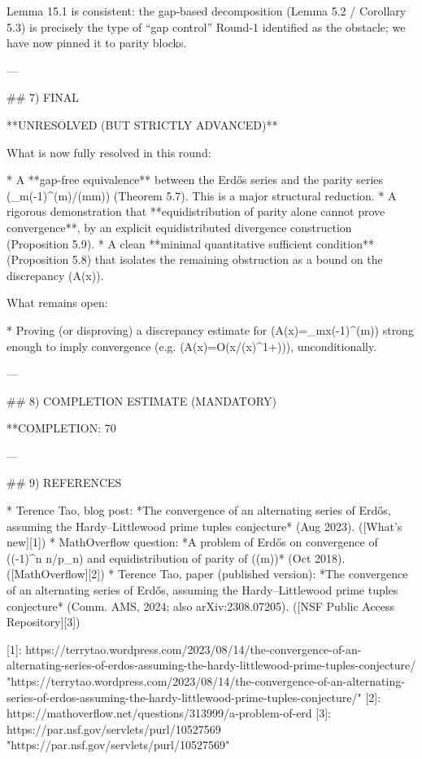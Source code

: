 Lemma 15.1 is consistent: the gap-based decomposition (Lemma 5.2 / Corollary 5.3) is precisely the type of “gap control” Round‑1 identified as the obstacle; we have now pinned it to parity blocks.

---

## 7) FINAL

**UNRESOLVED (BUT STRICTLY ADVANCED)**

What is now fully resolved in this round:

* A **gap-free equivalence** between the Erdős series and the parity series (\sum_{m}(-1)^{\pi(m)}/(m\log m)) (Theorem 5.7). This is a major structural reduction.
* A rigorous demonstration that **equidistribution of parity alone cannot prove convergence**, by an explicit equidistributed divergence construction (Proposition 5.9).
* A clean **minimal quantitative sufficient condition** (Proposition 5.8) that isolates the remaining obstruction as a bound on the discrepancy (A(x)).

What remains open:

* Proving (or disproving) a discrepancy estimate for (A(x)=\sum_{m\le x}(-1)^{\pi(m)}) strong enough to imply convergence (e.g. (A(x)=O(x/(\log\log x)^{1+\varepsilon}))), unconditionally.

---

## 8) COMPLETION ESTIMATE (MANDATORY)

**COMPLETION: 70%

---

## 9) REFERENCES

* Terence Tao, blog post: *The convergence of an alternating series of Erdős, assuming the Hardy–Littlewood prime tuples conjecture* (Aug 2023). ([What's new][1])
* MathOverflow question: *A problem of Erdős on convergence of (\sum (-1)^n n/p_n) and equidistribution of parity of (\pi(m))* (Oct 2018). ([MathOverflow][2])
* Terence Tao, paper (published version): *The convergence of an alternating series of Erdős, assuming the Hardy–Littlewood prime tuples conjecture* (Comm. AMS, 2024; also arXiv:2308.07205). ([NSF Public Access Repository][3])

[1]: https://terrytao.wordpress.com/2023/08/14/the-convergence-of-an-alternating-series-of-erdos-assuming-the-hardy-littlewood-prime-tuples-conjecture/ "https://terrytao.wordpress.com/2023/08/14/the-convergence-of-an-alternating-series-of-erdos-assuming-the-hardy-littlewood-prime-tuples-conjecture/"
[2]: https://mathoverflow.net/questions/313999/a-problem-of-erd%
[3]: https://par.nsf.gov/servlets/purl/10527569 "https://par.nsf.gov/servlets/purl/10527569"

